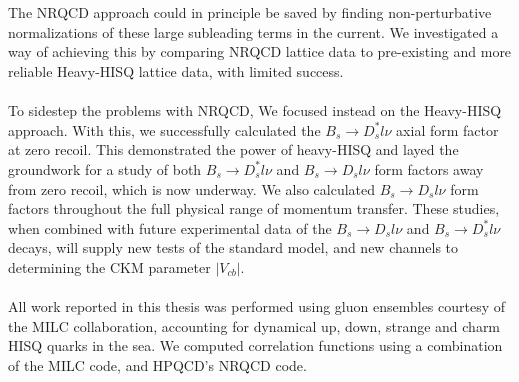 \\ \\
The NRQCD approach could in principle be saved by finding non-perturbative normalizations of these large subleading terms in the current. We investigated a way of achieving this by comparing NRQCD lattice data to pre-existing and more reliable Heavy-HISQ lattice data, with limited success.
\\ \\
To sidestep the problems with NRQCD, We focused instead on the Heavy-HISQ approach. With this, we successfully calculated the $B_s\to D_s^*l\nu$ axial form factor at zero recoil. This demonstrated the power of heavy-HISQ and layed the groundwork for a study of both $B_s\to D_s^*l\nu$ and $B_s\to D_sl\nu$ form factors away from zero recoil, which is now underway. We also calculated $B_s\to D_sl\nu$ form factors throughout the full physical range of momentum transfer. These studies, when combined with future experimental data of the $B_s\to D_sl\nu$ and $B_s\to D_s^*l\nu$ decays, will supply new tests of the standard model, and new channels to determining the CKM parameter $|V_{cb}|$.
\\ \\
All work reported in this thesis was performed using gluon ensembles courtesy of the MILC collaboration, accounting for dynamical up, down, strange and charm HISQ quarks in the sea. We computed correlation functions using a combination of the MILC code, and HPQCD's NRQCD code.
